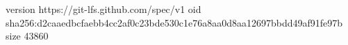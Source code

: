 version https://git-lfs.github.com/spec/v1
oid sha256:d2caaedbcfaebb4cc2af0c23bde530c1e76a8aa0d8aa12697bbdd49af91fe97b
size 43860
